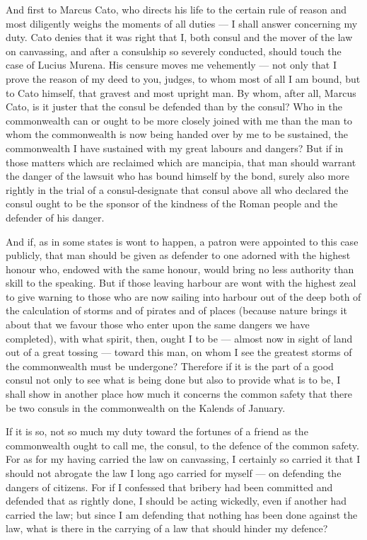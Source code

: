  And first to Marcus Cato, who directs his life to the certain rule of reason and most diligently weighs the moments of all duties --- I shall answer concerning my duty. Cato denies that it was right that I, both consul and the mover of the law on canvassing, and after a consulship so severely conducted, should touch the case of Lucius Murena. His censure moves me vehemently --- not only that I prove the reason of my deed to you, judges, to whom most of all I am bound, but to Cato himself, that gravest and most upright man. By whom, after all, Marcus Cato, is it juster that the consul be defended than by the consul? Who in the commonwealth can or ought to be more closely joined with me than the man to whom the commonwealth is now being handed over by me to be sustained, the commonwealth I have sustained with my great labours and dangers? But if in those matters which are reclaimed which are mancipia, that man should warrant the danger of the lawsuit who has bound himself by the bond, surely also more rightly in the trial of a consul-designate that consul above all who declared the consul ought to be the sponsor of the kindness of the Roman people and the defender of his danger.

 And if, as in some states is wont to happen, a patron were appointed to this case publicly, that man should be given as defender to one adorned with the highest honour who, endowed with the same honour, would bring no less authority than skill to the speaking. But if those leaving harbour are wont with the highest zeal to give warning to those who are now sailing into harbour out of the deep both of the calculation of storms and of pirates and of places (because nature brings it about that we favour those who enter upon the same dangers we have completed), with what spirit, then, ought I to be --- almost now in sight of land out of a great tossing --- toward this man, on whom I see the greatest storms of the commonwealth must be undergone? Therefore if it is the part of a good consul not only to see what is being done but also to provide what is to be, I shall show in another place how much it concerns the common safety that there be two consuls in the commonwealth on the Kalends of January.

 If it is so, not so much my duty toward the fortunes of a friend as the commonwealth ought to call me, the consul, to the defence of the common safety. For as for my having carried the law on canvassing, I certainly so carried it that I should not abrogate the law I long ago carried for myself --- on defending the dangers of citizens. For if I confessed that bribery had been committed and defended that as rightly done, I should be acting wickedly, even if another had carried the law; but since I am defending that nothing has been done against the law, what is there in the carrying of a law that should hinder my defence?

